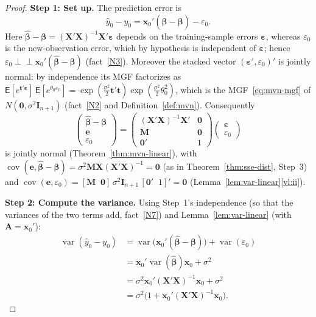 \documentclass[14pt]{extarticle}
\theoremstyle{plain}
\theoremstyle{definition}
\theoremstyle{remark}
\newcommand\expc{\mathsf{E}}
\DeclareMathOperator\var{var}
\DeclareMathOperator\cov{cov}
\newcommand{\bX}{\mathbf{X}}
\newcommand{\bx}{\mathbf{x}}
\def\bb{\boldsymbol{\beta}}
\newcommand{\be}{\boldsymbol{\varepsilon}}
\newcommand{\bI}{\mathbf{I}}
\newcommand{\bM}{\mathbf{M}}
\newcommand{\bzero}{\mathbf{0}}
\newcommand{\bA}{\mathbf{A}}
\newcommand{\indep}{\perp\!\!\!\perp}
\begin{document}
\begin{proof}
\textbf{Step 1: Set up.} The prediction error is
\[
\hat{y}_0 - y_0 = \bx_0'(\hat{\bb} - \bb) - \varepsilon_0.
\]
Here $\hat{\bb} - \bb = (\bX'\bX)^{-1}\bX'\be$ depends on the training-sample errors $\be$, whereas $\varepsilon_0$ is the new-observation error, which by hypothesis is independent of $\be$; hence $\varepsilon_0 \indep \bx_0'(\hat{\bb} - \bb)$ (fact~\ref{N3}). Moreover the stacked vector $(\be', \varepsilon_0)'$ is jointly normal: by independence its MGF factorizes as $\expc[e^{\mathbf{t}'\be}]\,\expc[e^{\theta_0\varepsilon_0}] = \exp(\tfrac{\sigma^2}{2}\mathbf{t}'\mathbf{t})\exp(\tfrac{\sigma^2}{2}\theta_0^2)$, which is the MGF~\eqref{eq:mvn-mgf} of $N(\bzero, \sigma^2\bI_{n+1})$ (fact~\ref{N2} and Definition~\ref{def:mvn}). Consequently
\begin{equation}\label{eq:pred-stack}
\begin{pmatrix}\hat{\bb} - \bb \\ \mathbf{e} \\ \varepsilon_0\end{pmatrix} = \begin{pmatrix}(\bX'\bX)^{-1}\bX' & \bzero \\ \bM & \bzero \\ \bzero' & 1\end{pmatrix}\begin{pmatrix}\be \\ \varepsilon_0\end{pmatrix}
\end{equation}
is jointly normal (Theorem~\ref{thm:mvn-linear}), with $\cov(\mathbf{e}, \hat{\bb} - \bb) = \sigma^2\bM\bX(\bX'\bX)^{-1} = \bzero$ (as in Theorem~\ref{thm:sse-dist}, Step~3) and $\cov(\mathbf{e}, \varepsilon_0) = [\bM \;\; \bzero]\,\sigma^2\bI_{n+1}\,[\bzero' \;\; 1]' = \bzero$ (Lemma~\ref{lem:var-linear}\ref{vl:ii}).

\textbf{Step 2: Compute the variance.} Using Step~1's independence (so that the variances of the two terms add, fact~\ref{N7}) and Lemma~\ref{lem:var-linear} (with $\bA = \bx_0'$):
\begin{align*}
\var(\hat{y}_0 - y_0) &= \var\!\bigl(\bx_0'(\hat{\bb} - \bb)\bigr) + \var(\varepsilon_0)\\
&= \bx_0'\var(\hat{\bb})\bx_0 + \sigma^2\\
&= \sigma^2\bx_0'(\bX'\bX)^{-1}\bx_0 + \sigma^2\\
&= \sigma^2\bigl(1 + \bx_0'(\bX'\bX)^{-1}\bx_0\bigr).
\end{align*}


\end{proof}
\end{document}
